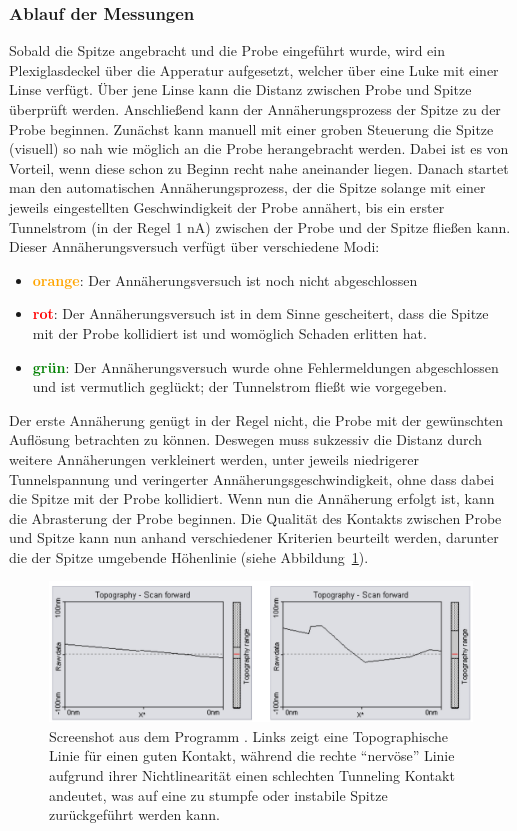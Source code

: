 \subsubsection{Ablauf der Messungen}
Sobald die Spitze angebracht und die Probe eingeführt wurde, 
wird ein Plexiglasdeckel über die Apperatur aufgesetzt, welcher
über eine Luke mit einer Linse verfügt. Über jene Linse kann die
Distanz zwischen Probe und Spitze überprüft werden. Anschließend
kann der Annäherungsprozess der Spitze zu der Probe beginnen. 
Zunächst kann manuell mit einer groben Steuerung die Spitze
(visuell) so nah wie möglich an die Probe herangebracht werden.
Dabei ist es von Vorteil, wenn diese schon zu Beginn recht nahe
aneinander liegen. Danach startet man den automatischen
Annäherungsprozess,
der die Spitze solange mit einer jeweils eingestellten
Geschwindigkeit der Probe annähert, bis ein erster Tunnelstrom
(in der Regel 1 nA)
zwischen der Probe und der Spitze fließen kann.  
Dieser Annäherungsversuch verfügt über verschiedene Modi:
\begin{itemize}
    \item \textbf{\textcolor{orange}{orange}}:
            Der Annäherungsversuch ist noch
            nicht abgeschlossen
    \item \textbf{\textcolor{red}{rot}}: 
            Der Annäherungsversuch ist in dem Sinne
            gescheitert, dass die Spitze mit der Probe kollidiert
            ist und womöglich Schaden erlitten hat. 
    \item \textbf{\textcolor{green}{grün}}: 
            Der Annäherungsversuch
            wurde ohne Fehlermeldungen
            abgeschlossen und ist vermutlich geglückt;
            der Tunnelstrom fließt wie vorgegeben.
\end{itemize}
Der erste Annäherung genügt in der Regel nicht, die Probe
mit der gewünschten Auflösung betrachten zu können. Deswegen muss
sukzessiv die Distanz 
durch weitere Annäherungen verkleinert werden,
unter jeweils niedrigerer
Tunnelspannung und veringerter Annäherungsgeschwindigkeit, 
ohne dass dabei die Spitze mit der Probe kollidiert.
Wenn nun die Annäherung erfolgt ist, kann die Abrasterung
der Probe beginnen. Die Qualität des Kontakts zwischen Probe
und Spitze kann nun anhand verschiedener Kriterien beurteilt werden,
darunter die der Spitze umgebende Höhenlinie (siehe
Abbildung~\ref{fig:topography}).
\begin{figure}
\includegraphics[width=14cm]{pics/Topography}
\caption{Screenshot aus dem Programm \cite{easyscan2_STM}. 
Links zeigt eine 
Topographische Linie für einen guten Kontakt, während die
rechte ``nervöse'' Linie aufgrund ihrer Nichtlinearität
einen schlechten Tunneling Kontakt
andeutet, was auf eine zu stumpfe oder instabile Spitze
zurückgeführt werden kann.}
 \label{fig:topography}
\end{figure}
